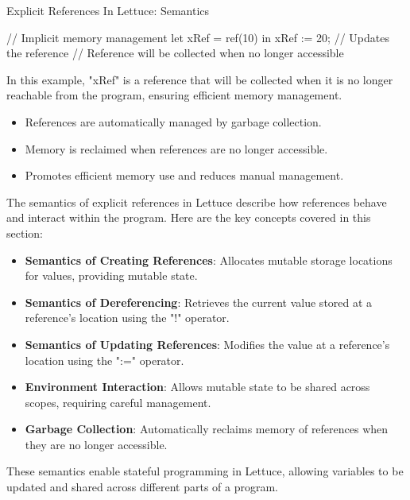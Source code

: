 \begin{notes}{Explicit References In Lettuce: Semantics}
\begin{highlight}
    \begin{code}[Lettuce]
    // Implicit memory management
    let xRef = ref(10) in
    xRef := 20; // Updates the reference
    // Reference will be collected when no longer accessible
    \end{code}
    
        In this example, "xRef" is a reference that will be collected when it is no longer reachable from the program, ensuring efficient memory management.
    
        \begin{itemize}
            \item References are automatically managed by garbage collection.
            \item Memory is reclaimed when references are no longer accessible.
            \item Promotes efficient memory use and reduces manual management.
        \end{itemize}
    
    \end{highlight}
    
    \begin{highlight}
    
        The semantics of explicit references in Lettuce describe how references behave and interact within the program. Here are the key concepts covered in this section:
    
        \begin{itemize}
            \item \textbf{Semantics of Creating References}: Allocates mutable storage locations for values, providing mutable state.
            \item \textbf{Semantics of Dereferencing}: Retrieves the current value stored at a reference's location using the "!" operator.
            \item \textbf{Semantics of Updating References}: Modifies the value at a reference's location using the ":=" operator.
            \item \textbf{Environment Interaction}: Allows mutable state to be shared across scopes, requiring careful management.
            \item \textbf{Garbage Collection}: Automatically reclaims memory of references when they are no longer accessible.
        \end{itemize}
    
        These semantics enable stateful programming in Lettuce, allowing variables to be updated and shared across different parts of a program.
    
    \end{highlight}
\end{notes}


